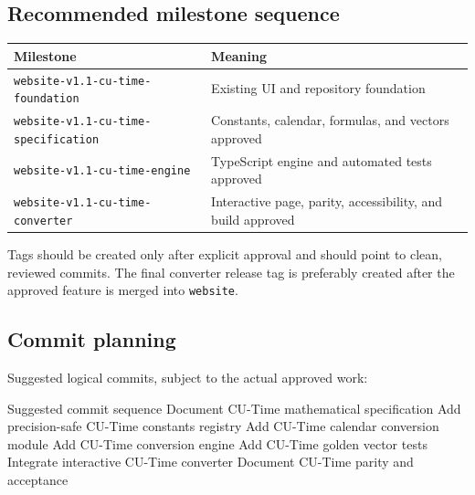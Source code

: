 \documentclass[11pt,letterpaper]{article}
\newcommand{\branchname}[1]{\texttt{#1}}
\begin{document}

\subsection{Recommended milestone sequence}

\begin{tabularx}{\textwidth}{L{2.55in}Y}
\toprule
\textbf{Milestone} & \textbf{Meaning} \\
\midrule
\nolinkurl{website-v1.1-cu-time-foundation} & Existing UI and repository foundation \\
\nolinkurl{website-v1.1-cu-time-specification} & Constants, calendar, formulas, and vectors approved \\
\nolinkurl{website-v1.1-cu-time-engine} & TypeScript engine and automated tests approved \\
\nolinkurl{website-v1.1-cu-time-converter} & Interactive page, parity, accessibility, and build approved \\
\bottomrule
\end{tabularx}

Tags should be created only after explicit approval and should point to clean,
reviewed commits. The final converter release tag is preferably created after
the approved feature is merged into \branchname{website}.

\subsection{Commit planning}

Suggested logical commits, subject to the actual approved work:

\begin{codebox}{Suggested commit sequence}
Document CU-Time mathematical specification
Add precision-safe CU-Time constants registry
Add CU-Time calendar conversion module
Add CU-Time conversion engine
Add CU-Time golden vector tests
Integrate interactive CU-Time converter
Document CU-Time parity and acceptance
\end{codebox}
\end{document}
